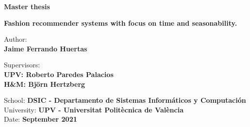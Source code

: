 \documentclass{kththesis}
\begin{document}
\begin{titlepage}
\begin{center}
        
        
        \textbf{\Large{Master thesis}}
        
        \vspace{0.5cm}
        \textbf{Fashion recommender systems with focus on time and 
        seasonability.}
    
        
        \vspace{1.5cm}
        Author:
        \\
        \textbf{Jaime Ferrando Huertas}
        
        \vspace{1.5cm}
        Supervisors:
        \\
        \textbf{UPV: Roberto Paredes Palacios}\\
        \textbf{H\&M: Björn Hertzberg}
        
        \vfill
        School:  \textbf{DSIC - Departamento de Sistemas Informáticos y Computación}
        \\
        University: \textbf{UPV - Universitat Politècnica de València} 
        \\
        Date: \textbf{September 2021}
        
    \end{center}
\end{titlepage}


\tableofcontents
\clearpage
\end{document}
